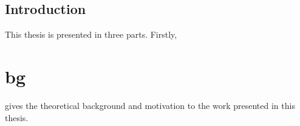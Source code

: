 \graphicspath{{Chapters/Introduction/Figures/}}

\chapter*{Introduction}
\label{chap:Introduction}

This thesis is presented in three parts. Firstly,~\part{bg} gives the theoretical background
and motivation to the work presented in this thesis.

